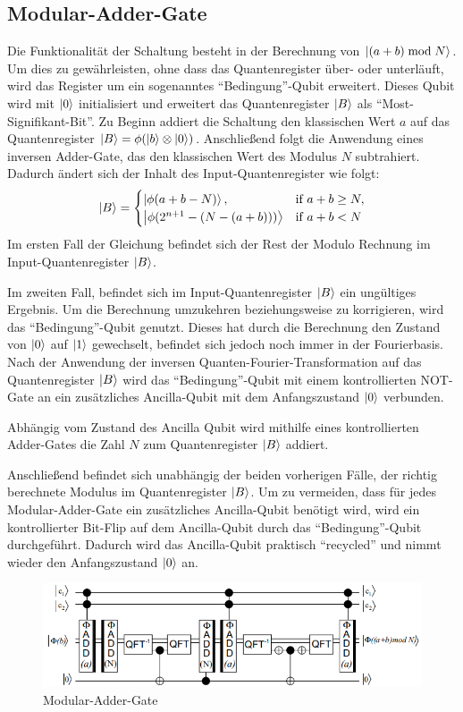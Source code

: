 \documentclass[lettersize,journal]{IEEEtran}
\begin{document}
\subsection{Modular-Adder-Gate}
Die Funktionalität der Schaltung besteht in der Berechnung von
\(\ket{(a+b) \bmod N}\).
Um dies zu gewährleisten, ohne dass das Quantenregister über- oder unterläuft,
wird das Register um ein sogenanntes "`Bedingung"'-Qubit erweitert.
Dieses Qubit wird mit \(\ket{0}\) initialisiert und
erweitert das Quantenregister \(\ket{B}\) als "`Most-Signifikant-Bit"'.
Zu Beginn addiert die Schaltung den klassischen Wert \(a\) auf das Quantenregister
\(\ket{B} = \phi(\ket{b} \otimes \ket{0})\).
Anschließend folgt die Anwendung eines inversen Adder-Gate,
das den klassischen Wert des Modulus \(N\) subtrahiert.
Dadurch ändert sich der Inhalt des Input-Quantenregister wie folgt:
\begin{equation*}
\ket{B} = \begin{cases}
  \ket{\phi(a+b-N)},            & {\text{if}}\ a+b \geq N,\\
  \ket{\phi(2^{n+1}-(N-(a+b)))} & {\text{if}}\ a+b < N
\end{cases}
\end{equation*}
Im ersten Fall der Gleichung befindet sich der Rest der Modulo Rechnung im Input-Quantenregister \(\ket{B}\).

Im zweiten Fall, befindet sich im Input-Quantenregister \(\ket{B}\) ein ungültiges Ergebnis.
Um die Berechnung umzukehren beziehungsweise zu korrigieren,
wird das "`Bedingung"'-Qubit genutzt.
Dieses hat durch die Berechnung den Zustand von \(\ket{0}\) auf \(\ket{1}\) gewechselt,
befindet sich jedoch noch immer in der Fourierbasis.
Nach der Anwendung der inversen Quanten-Fourier-Transformation
auf das Quantenregister \(\ket{B}\) wird das "`Bedingung"'-Qubit
mit einem kontrollierten NOT-Gate an ein zusätzliches Ancilla-Qubit mit dem Anfangszustand \(\ket{0}\) verbunden.

Abhängig vom Zustand des Ancilla Qubit wird mithilfe
eines kontrollierten Adder-Gates die Zahl \(N\) zum Quantenregister \(\ket{B}\) addiert.

Anschließend befindet sich unabhängig der beiden vorherigen Fälle,
der richtig berechnete Modulus im Quantenregister \(\ket{B}\).
Um zu vermeiden, dass für jedes Modular-Adder-Gate ein zusätzliches Ancilla-Qubit benötigt wird,
wird ein kontrollierter Bit-Flip auf dem Ancilla-Qubit durch das "`Bedingung"'-Qubit durchgeführt.
Dadurch wird das Ancilla-Qubit praktisch "`recycled"' und nimmt wieder den Anfangszustand \(\ket{0}\) an.
\begin{figure}[!h]
\caption{Modular-Adder-Gate~\cite{beauregard2003circuit}}
\label{fig:modular_adder_gate}
\includegraphics[width=\linewidth]{modular_adder_gate.PNG}
\centering
\end{figure}
\end{document}
